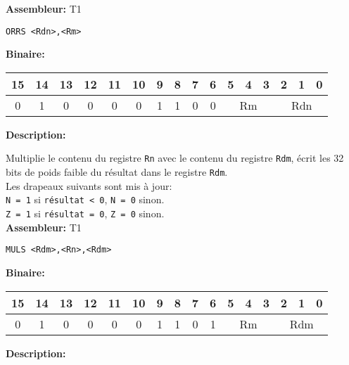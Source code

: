 \textbf{Assembleur:} T1

\begin{lstlisting}
ORRS <Rdn>,<Rm>
\end{lstlisting}

\textbf{Binaire:}\\

\begin{tabular}{| c c c c c c c c c c c c c c c c |}
\hline
15 & 14 & 13 & 12 & 11 & 10 & \multicolumn{1}{|c}{9} & 8 & 7 & 6 & \multicolumn{1}{|c}{5} & 4 & 3 & \multicolumn{1}{|c}{2} & 1 & 0 \\
\hline
0 & 1 & 0 & 0 & 0 & 0 & \multicolumn{1}{|c}{1} & 1 & 0 & 0 & \multicolumn{3}{|c}{Rm} & \multicolumn{3}{|c|}{Rdn} \\
\hline
\end{tabular}



\textbf{Description: }

Multiplie le contenu du registre \texttt{Rn} avec le contenu du registre \texttt{Rdm}, écrit les 32 bits de poids faible du résultat dans le registre \texttt{Rdm}.\\
Les drapeaux suivants sont mis à jour:\\
\texttt{N = 1} si \texttt{résultat < 0}, \texttt{N = 0} sinon.\\
\texttt{Z = 1} si \texttt{résultat = 0}, \texttt{Z = 0} sinon.\\

\textbf{Assembleur:} T1

\begin{lstlisting}
MULS <Rdm>,<Rn>,<Rdm>
\end{lstlisting}

\textbf{Binaire:}\\

\begin{tabular}{| c c c c c c c c c c c c c c c c |}
\hline
15 & 14 & 13 & 12 & 11 & 10 & \multicolumn{1}{|c}{9} & 8 & 7 & 6 & \multicolumn{1}{|c}{5} & 4 & 3 & \multicolumn{1}{|c}{2} & 1 & 0 \\
\hline
0 & 1 & 0 & 0 & 0 & 0 & \multicolumn{1}{|c}{1} & 1 & 0 & 1 & \multicolumn{3}{|c}{Rm} & \multicolumn{3}{|c|}{Rdm} \\
\hline
\end{tabular}



\textbf{Description: }


